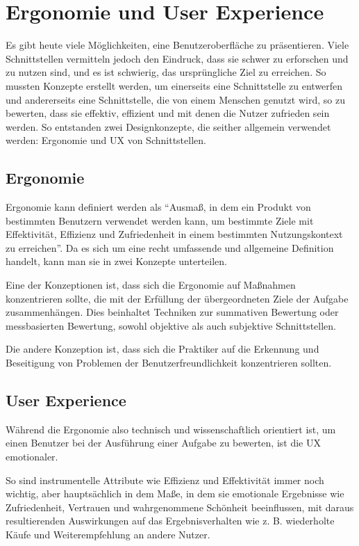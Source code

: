 \section{Ergonomie und User Experience}


Es gibt heute viele Möglichkeiten, eine Benutzeroberfläche zu präsentieren.
Viele Schnittstellen vermitteln jedoch den Eindruck, dass sie schwer zu erforschen und zu nutzen sind, und es ist schwierig, das ursprüngliche Ziel zu erreichen.
So mussten Konzepte erstellt werden, um einerseits eine Schnittstelle zu entwerfen und andererseits eine Schnittstelle, die von einem Menschen genutzt wird, so zu bewerten, dass sie effektiv, effizient und mit denen die Nutzer zufrieden sein werden.
So entstanden zwei Designkonzepte, die seither allgemein verwendet werden: Ergonomie und \ac{UX} von Schnittstellen.

\subsection{Ergonomie}

Ergonomie kann definiert werden als ``Ausmaß, in dem ein Produkt von bestimmten Benutzern verwendet werden kann, um bestimmte Ziele mit Effektivität, Effizienz und Zufriedenheit in einem bestimmten Nutzungskontext zu erreichen''\cite{bastienscapin}.
Da es sich um eine recht umfassende und allgemeine Definition handelt, kann man sie in zwei Konzepte unterteilen.

Eine der Konzeptionen ist, dass sich die Ergonomie auf Maßnahmen konzentrieren sollte, die mit der Erfüllung der übergeordneten Ziele der Aufgabe zusammenhängen. Dies beinhaltet Techniken zur summativen Bewertung oder messbasierten Bewertung, sowohl objektive als auch subjektive Schnittstellen.

Die andere Konzeption ist, dass sich die Praktiker auf die Erkennung und Beseitigung von Problemen der Benutzerfreundlichkeit konzentrieren sollten.

\subsection{User Experience}

Während die Ergonomie also technisch und wissenschaftlich orientiert ist, um einen Benutzer bei der Ausführung einer Aufgabe zu bewerten, ist die UX emotionaler.

So sind instrumentelle Attribute wie Effizienz und Effektivität immer noch wichtig, aber hauptsächlich in dem Maße, in dem sie emotionale Ergebnisse wie Zufriedenheit, Vertrauen und wahrgenommene Schönheit beeinflussen, mit daraus resultierenden Auswirkungen auf das Ergebnisverhalten wie z. B. wiederholte Käufe und Weiterempfehlung an andere Nutzer.

